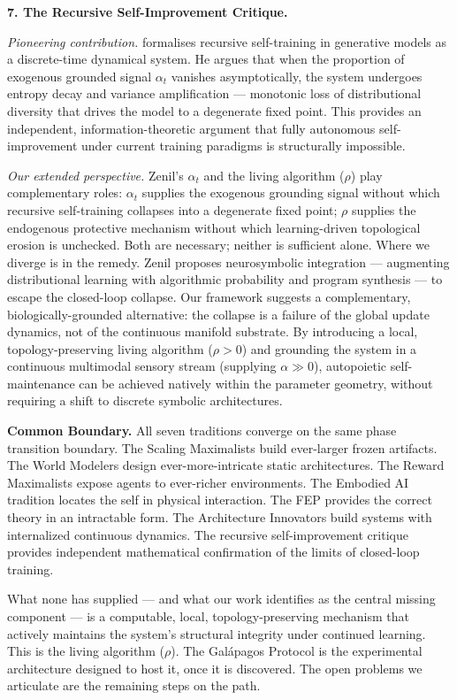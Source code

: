 \documentclass{article}
\begin{document}
\bigskip
\noindent\textbf{7. The Recursive Self-Improvement Critique.}

\emph{Pioneering contribution.} \citet{Zenil2026limits} formalises recursive self-training in generative models as a discrete-time dynamical system. He argues that when the proportion of exogenous grounded signal $\alpha_t$ vanishes asymptotically, the system undergoes entropy decay and variance amplification — monotonic loss of distributional diversity that drives the model to a degenerate fixed point. This provides an independent, information-theoretic argument that fully autonomous self-improvement under current training paradigms is structurally impossible.

\emph{Our extended perspective.} Zenil's $\alpha_t$ and the living algorithm ($\rho$) play complementary roles: $\alpha_t$ supplies the exogenous grounding signal without which recursive self-training collapses into a degenerate fixed point; $\rho$ supplies the endogenous protective mechanism without which learning-driven topological erosion is unchecked. Both are necessary; neither is sufficient alone. Where we diverge is in the remedy. Zenil proposes neurosymbolic integration — augmenting distributional learning with algorithmic probability and program synthesis — to escape the closed-loop collapse. Our framework suggests a complementary, biologically-grounded alternative: the collapse is a failure of the global update dynamics, not of the continuous manifold substrate. By introducing a local, topology-preserving living algorithm ($\rho > 0$) and grounding the system in a continuous multimodal sensory stream (supplying $\alpha \gg 0$), autopoietic self-maintenance can be achieved natively within the parameter geometry, without requiring a shift to discrete symbolic architectures.

\bigskip
\noindent\textbf{Common Boundary.}
All seven traditions converge on the same phase transition boundary. The Scaling Maximalists build ever-larger frozen artifacts. The World Modelers design ever-more-intricate static architectures. The Reward Maximalists expose agents to ever-richer environments. The Embodied AI tradition locates the self in physical interaction. The FEP provides the correct theory in an intractable form. The Architecture Innovators build systems with internalized continuous dynamics. The recursive self-improvement critique provides independent mathematical confirmation of the limits of closed-loop training.

What none has supplied — and what our work identifies as the central missing component — is a computable, local, topology-preserving mechanism that actively maintains the system's structural integrity under continued learning. This is the living algorithm ($\rho$). The Galápagos Protocol is the experimental architecture designed to host it, once it is discovered. The open problems we articulate are the remaining steps on the path.
\end{document}

